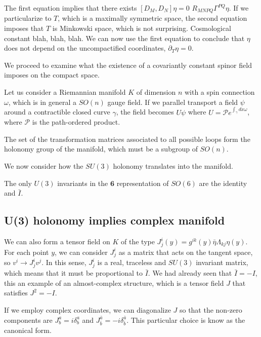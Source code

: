 The first equation implies that there exists $[D_M,D_N]\eta=0$ $R_{MNPQ} \Gamma^{PQ} \eta$.
If we particularize to $T$, which is a maximally symmetric space, the second equation imposes that
$T$ is Minkowski space, which is not surprising.
Cosmological constant blah, blah, blah.
We can now use the first equation to conclude that $\eta$ does not depend on the uncompactified 
coordinates,  $\partial_T \eta=0$.

We proceed to examine what the existence of a covariantly constant spinor field imposes on the compact space. 

Let us consider a Riemannian manifold $K$ of dimension $n$ with a spin connection $\omega$, which 
is in general a $SO(n)$ gauge field.
If we parallel transport a field $\psi$ around a contractible closed curve $\gamma$, the field becomes
$U\psi$ where $U=\mathcal P e^{\int_\gamma dx \omega}$, where $\mathcal P$ is the path-ordered product.

The set of the transformation matrices associated to all possible loops form the holonomy group of the manifold, 
which must be a subgroup of $SO(n)$.


We now consider how the $SU(3)$ holonomy translates into the manifold. 


The only  $U(3)$ invariants in the $\mathbf{6}$ representation of $SO(6)$ are the identity and
$\bar I$.

\subsection{U(3) holonomy implies complex manifold}

We can also form a tensor field on $K$ of the type $J^i_j(y)=g^{ik}(y) \bar\eta \Lambda_{kj} \eta(y)$.
For each point $y$, we can consider $J^i_j$ as a matrix that acts on the tangent space, so $v^i \to J^i_j v^j$.
In this sense, $J^i_j$ is a real, traceless and $SU(3)$ invariant matrix, which means that it must be proportional
to $\bar I$.
We had already seen that $\bar I = -I$, this an example of an almost-complex structure, which is 
a tensor field $J$ that satisfies $J^2=-I$.

If we employ complex coordinates, we can diagonalize $J$ so that the non-zero components are
$J^a_b=i\delta^a_b$ and $J^{\bar a}_{\bar b}=-i\delta^{\bar a}_{\bar b}$. This particular choice
is know as the canonical form.



